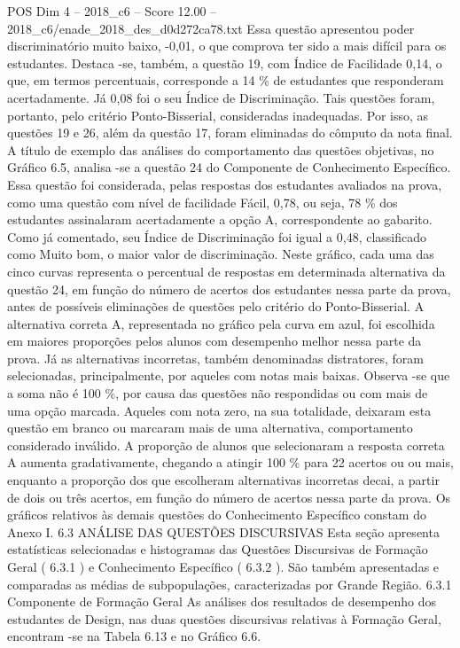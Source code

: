 \begin{textsample}{POS Dim 4 – 2018\_c6 – Score 12.00 – 2018\_c6/enade\_2018\_des\_d0d272ca78.txt}
Essa questão apresentou poder discriminatório muito baixo, -0,01, o que comprova ter sido a mais difícil para os estudantes.
Destaca -se, também, a questão 19, com Índice de Facilidade 0,14, o que, em termos percentuais, corresponde a 14 \% de estudantes que responderam acertadamente.
Já 0,08 foi o seu Índice de Discriminação.
Tais questões foram, portanto, pelo critério Ponto-Bisserial, consideradas inadequadas.
Por isso, as questões 19 e 26, além da questão 17, foram eliminadas do cômputo da nota final.
A título de exemplo das análises do comportamento das questões objetivas, no Gráfico 6.5, analisa -se a questão 24 do Componente de Conhecimento Específico.
Essa questão foi considerada, pelas respostas dos estudantes avaliados na prova, como uma questão com nível de facilidade Fácil, 0,78, ou seja, 78 \% dos estudantes assinalaram acertadamente a opção A, correspondente ao gabarito.
Como já comentado, seu Índice de Discriminação foi igual a 0,48, classificado como Muito bom, o maior valor de discriminação.
Neste gráfico, cada uma das cinco curvas representa o percentual de respostas em determinada alternativa da questão 24, em função do número de acertos dos estudantes nessa parte da prova, antes de possíveis eliminações de questões pelo critério do Ponto-Bisserial.
A alternativa correta A, representada no gráfico pela curva em azul, foi escolhida em maiores proporções pelos alunos com desempenho melhor nessa parte da prova.
Já as alternativas incorretas, também denominadas distratores, foram selecionadas, principalmente, por aqueles com notas mais baixas.
Observa -se que a soma não é 100 \%, por causa das questões não respondidas ou com mais de uma opção marcada.
Aqueles com nota zero, na sua totalidade, deixaram esta questão em branco ou marcaram mais de uma alternativa, comportamento considerado inválido.
A proporção de alunos que selecionaram a resposta correta A aumenta gradativamente, chegando a atingir 100 \% para 22 acertos ou ou mais, enquanto a proporção dos que escolheram alternativas incorretas decai, a partir de dois ou três acertos, em função do número de acertos nessa parte da prova.
Os gráficos relativos às demais questões do Conhecimento Específico constam do Anexo I. 6.3 ANÁLISE DAS QUESTÕES DISCURSIVAS Esta seção apresenta estatísticas selecionadas e histogramas das Questões Discursivas de Formação Geral ( 6.3.1 ) e Conhecimento Específico ( 6.3.2 ).
São também apresentadas e comparadas as médias de subpopulações, caracterizadas por Grande Região. 6.3.1 Componente de Formação Geral As análises dos resultados de desempenho dos estudantes de Design, nas duas questões discursivas relativas à Formação Geral, encontram -se na Tabela 6.13 e no Gráfico 6.6.

\end{textsample}
